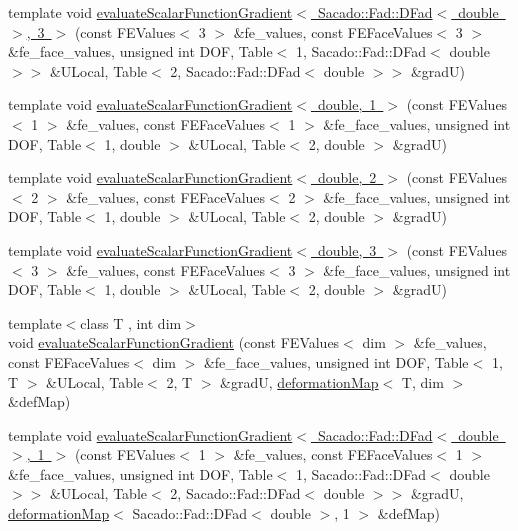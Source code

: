 \begin{DoxyCompactItemize}
\item 
template void \mbox{\hyperlink{function_evaluations_8cc_aa26b2aef5debe4912a94bd082f89223e}{evaluate\+Scalar\+Function\+Gradient$<$ Sacado\+::\+Fad\+::\+D\+Fad$<$ double $>$, 3 $>$}} (const F\+E\+Values$<$ 3 $>$ \&fe\+\_\+values, const F\+E\+Face\+Values$<$ 3 $>$ \&fe\+\_\+face\+\_\+values, unsigned int D\+OF, Table$<$ 1, Sacado\+::\+Fad\+::\+D\+Fad$<$ double $>$$>$ \&U\+Local, Table$<$ 2, Sacado\+::\+Fad\+::\+D\+Fad$<$ double $>$$>$ \&gradU)
\item 
template void \mbox{\hyperlink{function_evaluations_8cc_a91bad8776fff0a4128d167e13f9cba03}{evaluate\+Scalar\+Function\+Gradient$<$ double, 1 $>$}} (const F\+E\+Values$<$ 1 $>$ \&fe\+\_\+values, const F\+E\+Face\+Values$<$ 1 $>$ \&fe\+\_\+face\+\_\+values, unsigned int D\+OF, Table$<$ 1, double $>$ \&U\+Local, Table$<$ 2, double $>$ \&gradU)
\item 
template void \mbox{\hyperlink{function_evaluations_8cc_a6a96dc1c1ba16074a76b1d809a10a3c6}{evaluate\+Scalar\+Function\+Gradient$<$ double, 2 $>$}} (const F\+E\+Values$<$ 2 $>$ \&fe\+\_\+values, const F\+E\+Face\+Values$<$ 2 $>$ \&fe\+\_\+face\+\_\+values, unsigned int D\+OF, Table$<$ 1, double $>$ \&U\+Local, Table$<$ 2, double $>$ \&gradU)
\item 
template void \mbox{\hyperlink{function_evaluations_8cc_a0a5f51dad78d15ef40ed772bb4eeea4c}{evaluate\+Scalar\+Function\+Gradient$<$ double, 3 $>$}} (const F\+E\+Values$<$ 3 $>$ \&fe\+\_\+values, const F\+E\+Face\+Values$<$ 3 $>$ \&fe\+\_\+face\+\_\+values, unsigned int D\+OF, Table$<$ 1, double $>$ \&U\+Local, Table$<$ 2, double $>$ \&gradU)
\item 
{\footnotesize template$<$class T , int dim$>$ }\\void \mbox{\hyperlink{group___evaluation_functions_gabedd4ae2841d2332ed0df0513b189e34}{evaluate\+Scalar\+Function\+Gradient}} (const F\+E\+Values$<$ dim $>$ \&fe\+\_\+values, const F\+E\+Face\+Values$<$ dim $>$ \&fe\+\_\+face\+\_\+values, unsigned int D\+OF, Table$<$ 1, T $>$ \&U\+Local, Table$<$ 2, T $>$ \&gradU, \mbox{\hyperlink{structdeformation_map}{deformation\+Map}}$<$ T, dim $>$ \&def\+Map)
\item 
template void \mbox{\hyperlink{function_evaluations_8cc_a5cba4e9f1222a7f8c1d9776c905bad20}{evaluate\+Scalar\+Function\+Gradient$<$ Sacado\+::\+Fad\+::\+D\+Fad$<$ double $>$, 1 $>$}} (const F\+E\+Values$<$ 1 $>$ \&fe\+\_\+values, const F\+E\+Face\+Values$<$ 1 $>$ \&fe\+\_\+face\+\_\+values, unsigned int D\+OF, Table$<$ 1, Sacado\+::\+Fad\+::\+D\+Fad$<$ double $>$$>$ \&U\+Local, Table$<$ 2, Sacado\+::\+Fad\+::\+D\+Fad$<$ double $>$$>$ \&gradU, \mbox{\hyperlink{structdeformation_map}{deformation\+Map}}$<$ Sacado\+::\+Fad\+::\+D\+Fad$<$ double $>$, 1 $>$ \&def\+Map)

\end{DoxyCompactItemize}
